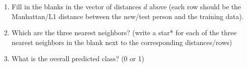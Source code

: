 \documentclass{article}
\begin{document}
\begin{enumerate}
\item Fill in the blanks in the vector of distances $d$ above (each
  row should be the Manhattan/L1 distance between the new/test person
  and the training data).
\item Which are the three nearest neighbors? (write a star* for each
  of the three nearest neighbors in the blank next to the
  corresponding distances/rows)
\item What is the overall predicted class? (0 or 1)
\end{enumerate}
\end{document}
